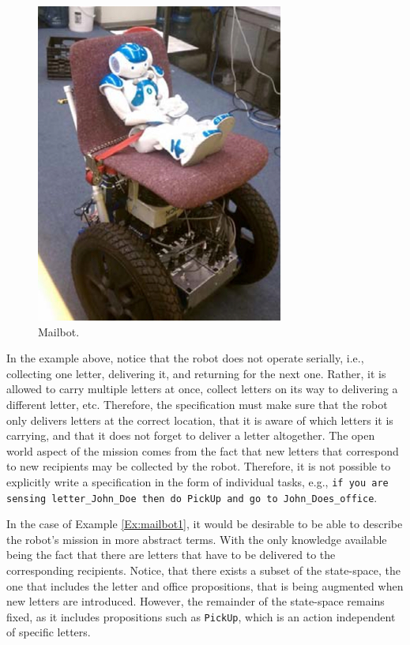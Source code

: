 \begin{figure}[ht]
	\centering
	\includegraphics[width=0.7\columnwidth, clip]{./img/pr3.jpg}
	\caption{Mailbot.}
	\label{Fig:pr3}
\end{figure}

In the example above, notice that the robot does not operate serially, i.e., collecting one letter, delivering it, and returning for the next one. Rather, it is allowed to carry multiple letters at once, collect letters on its way to delivering a different letter, etc. Therefore, the specification must make sure that the robot only delivers letters at the correct location, that it is aware of which letters it is carrying, and that it does not forget to deliver a letter altogether. The open world aspect of the mission comes from the fact that new letters that correspond to new recipients may be collected by the robot. Therefore, it is not possible to explicitly write a specification in the form of individual tasks, e.g., \texttt{if you are sensing letter\_John\_Doe then do PickUp and go to John\_Does\_office}.

In the case of Example \ref{Ex:mailbot1}, it would be desirable to be able to describe the robot's mission in more abstract terms. With the only knowledge available being the fact that there are letters that have to be delivered to the corresponding recipients. Notice, that there exists a subset of the state-space, the one that includes the letter and office propositions, that is being augmented when new letters are introduced. However, the remainder of the state-space remains fixed, as it includes propositions such as \texttt{PickUp}, which is an action independent of specific letters. 


